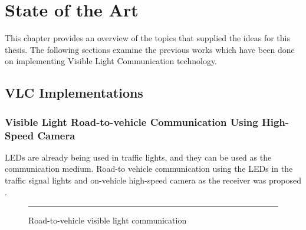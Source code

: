 
\chapter{State of the Art} %

\label{SoA} %


This chapter provides an overview of the topics that supplied the ideas for this thesis. The
following sections examine the previous works which have been done on implementing
Visible Light Communication technology.


\section{VLC Implementations}

\subsection{Visible Light Road-to-vehicle Communication Using High-Speed Camera}

LEDs are already being used in traffic lights, and they can be used as the communication
medium. Road-to vehicle communication using the LEDs in the traffic signal lights and on-vehicle high-speed camera as the receiver was
proposed \citep{1505169}.

\begin{figure}[htbp]
  \centering
    \rule{35em}{0.5pt}
  \caption[Road-to-vehicle visible light communication]{Road-to-vehicle visible light communication}
  \label{fig:vlc-road}
\end{figure}

